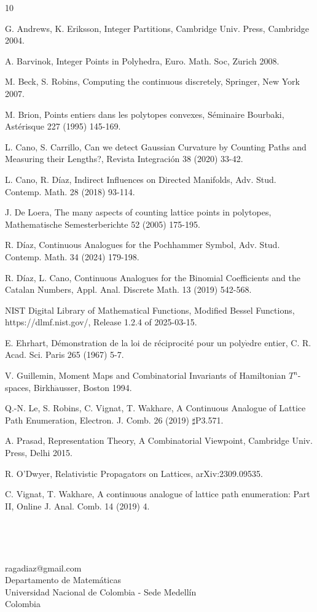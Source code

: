 \documentclass[10pt,leqeq]{article}
\begin{document}
\begin{thebibliography}{10}


G. Andrews, K. Eriksson, Integer Partitions, Cambridge Univ. Press, 
Cambridge 2004.

 A. Barvinok, Integer Points in Polyhedra, Euro. Math. Soc, Z$\ddot{\mbox{u}}$rich 2008.

M. Beck, S. Robins, Computing the continuous discretely, Springer,
New York 2007.

M. Brion, Points entiers dans les polytopes convexes, S\'eminaire Bourbaki, Ast\'erisque
227 (1995) 145-169.

L. Cano, S. Carrillo, Can we detect Gaussian Curvature by Counting Paths and Measuring their Lengths?, Revista Integraci\'on 38 (2020)  33-42.



L. Cano, R. D\'iaz, Indirect Influences on Directed Manifolds, Adv. Stud. Contemp. Math. 28 (2018) 93-114.

 J. De Loera, The many aspects of counting lattice points in polytopes, Mathematische Semesterberichte 52 (2005) 175-195.

R. D\'iaz, Continuous Analogues for the Pochhammer Symbol,
Adv. Stud. Contemp. Math. 34 (2024) 179-198.


R. D\'iaz, L. Cano,  Continuous Analogues for the
Binomial Coefficients and the Catalan Numbers, Appl. Anal. Discrete
Math. 13 (2019) 542-568.

NIST Digital Library of Mathematical Functions, Modified Bessel Functions, https://dlmf.nist.gov/, Release 1.2.4 of 2025-03-15. 


E. Ehrhart, D\'emonstration de la loi de r\'eciprocit\'e pour un poly$\grave{\mbox{e}}$dre entier, C. R.
Acad. Sci. Paris 265 (1967) 5-7.

V. Guillemin, Moment Maps and Combinatorial Invariants of Hamiltonian 
$T^n$-spaces, Birkh$\ddot{\mbox{a}}$usser, Boston 1994.



Q.-N. Le, S. Robins, C. Vignat, T. Wakhare, A Continuous Analogue of Lattice Path Enumeration, Electron. J. Comb.
26 (2019) $\sharp$P3.571.

A. Prasad, Representation Theory, A Combinatorial Viewpoint, Cambridge Univ.
Press, Delhi 2015.


R. O'Dwyer, Relativistic Propagators on Lattices, arXiv:2309.09535.

 C. Vignat, T. Wakhare,  A continuous analogue of lattice path enumeration: Part II, Online J. Anal. Comb. 14 (2019) 4.
\end{thebibliography}

\

\

\noindent ragadiaz@gmail.com\\
\noindent Departamento de Matem\'aticas \\
\noindent Universidad Nacional de Colombia - Sede Medell\' in\\
\noindent Colombia\\
\end{document}
